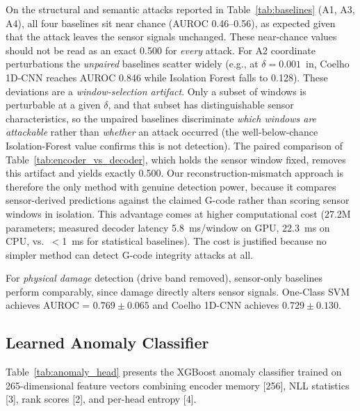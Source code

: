 On the structural and semantic attacks reported in Table~\ref{tab:baselines} (A1, A3, A4), all four baselines sit near chance (AUROC 0.46--0.56), as expected given that the attack leaves the sensor signals unchanged.
These near-chance values should not be read as an exact 0.500 for \emph{every} attack.
For A2 coordinate perturbations the \emph{unpaired} baselines scatter widely (e.g., at $\delta = 0.001$~in, Coelho 1D-CNN reaches AUROC 0.846 while Isolation Forest falls to 0.128).
These deviations are a \emph{window-selection artifact}.
Only a subset of windows is perturbable at a given $\delta$, and that subset has distinguishable sensor characteristics, so the unpaired baselines discriminate \emph{which windows are attackable} rather than \emph{whether} an attack occurred (the well-below-chance Isolation-Forest value confirms this is not detection).
The paired comparison of Table~\ref{tab:encoder_vs_decoder}, which holds the sensor window fixed, removes this artifact and yields exactly 0.500.
Our reconstruction-mismatch approach is therefore the only method with genuine detection power, because it compares sensor-derived predictions against the claimed G-code rather than scoring sensor windows in isolation.
This advantage comes at higher computational cost (27.2M parameters; measured decoder latency 5.8~ms/window on GPU, 22.3~ms on CPU, vs.\ $<$1~ms for statistical baselines).
The cost is justified because no simpler method can detect G-code integrity attacks at all.

For \emph{physical damage} detection (drive band removed), sensor-only baselines perform comparably, since damage directly alters sensor signals.
One-Class SVM achieves AUROC = $0.769 \pm 0.065$ and Coelho 1D-CNN achieves $0.729 \pm 0.130$.

\subsection{Learned Anomaly Classifier}
\label{sec:results_anomaly_head}

Table~\ref{tab:anomaly_head} presents the XGBoost anomaly classifier trained on 265-dimensional feature vectors combining encoder memory [256], NLL statistics [3], rank scores [2], and per-head entropy [4].

